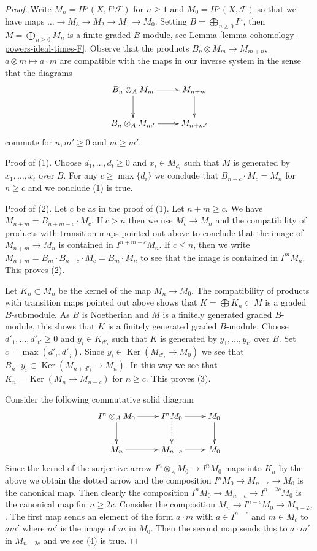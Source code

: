 \documentclass{stacks-project}
\theoremstyle{plain}
\theoremstyle{definition}
\theoremstyle{remark}
\numberwithin{equation}{subsection}
\def\Ker{\mathop{\mathrm{Ker}}}
\begin{document}
\begin{proof}
Write $M_n = H^p(X, I^n\mathcal{F})$ for $n \geq 1$ and
$M_0 = H^p(X, \mathcal{F})$ so that we have maps
$\ldots \to M_3 \to M_2 \to M_1 \to M_0$. Setting
$B = \bigoplus_{n \geq 0} I^n$, then $M = \bigoplus_{n \geq 0} M_n$
is a finite graded $B$-module, see
Lemma \ref{lemma-cohomology-powers-ideal-times-F}.
Observe that the products
$B_n \otimes M_m \to M_{m + n}$, $a \otimes m \mapsto a \cdot m$
are compatible with the maps in our inverse system in the sense
that the diagrams
$$
\xymatrix{
B_n \otimes_A M_m \ar[r] \ar[d] & M_{n + m} \ar[d] \\
B_n \otimes_A M_{m'} \ar[r] & M_{n + m'}
}
$$
commute for $n, m' \geq 0$ and $m \geq m'$.

\medskip\noindent
Proof of (1). Choose $d_1, \ldots, d_t \geq 0$ and $x_i \in M_{d_i}$
such that $M$ is generated by $x_1, \ldots, x_t$ over $B$.
For any $c \geq \max\{d_i\}$ we conclude that
$B_{n - c} \cdot M_c = M_n$ for $n \geq c$ and we conclude (1) is true.

\medskip\noindent
Proof of (2). Let $c$ be as in the proof of (1). Let $n + m \geq c$.
We have $M_{n + m} = B_{n + m - c} \cdot M_c$.
If $c > n$ then we use $M_c \to M_n$ and the compatibility of products
with transition maps pointed out above to conclude that
the image of $M_{n + m} \to M_n$ is contained in $I^{n + m - c}M_n$.
If $c \leq n$, then we write $M_{n + m} = B_m \cdot B_{n - c} \cdot M_c =
B_m \cdot M_n$ to see that the image is contained in $I^m M_n$.
This proves (2).

\medskip\noindent
Let $K_n \subset M_n$ be the kernel of the map $M_n \to M_0$. The
compatibility of products with transition maps pointed out above
shows that $K = \bigoplus K_n \subset M$ is a graded $B$-submodule.
As $B$ is Noetherian and $M$ is a finitely generated graded $B$-module,
this shows that $K$ is a finitely generated graded $B$-module.
Choose $d'_1, \ldots, d'_{t'} \geq 0$ and $y_i \in K_{d'_i}$
such that $K$ is generated by $y_1, \ldots, y_{t'}$ over $B$.
Set $c = \max(d'_i, d'_j)$. Since $y_i \in \Ker(M_{d'_i} \to M_0)$
we see that $B_n \cdot y_i \subset \Ker(M_{n + d'_i} \to M_n)$.
In this way we see that $K_n = \Ker(M_n \to M_{n - c})$ for $n \geq c$.
This proves (3).

\medskip\noindent
Consider the following commutative solid diagram
$$
\xymatrix{
I^n \otimes_A M_0 \ar[r] \ar[d] &
I^nM_0 \ar[r] \ar@{..>}[d] &
M_0 \ar[d] \\
M_n \ar[r] &
M_{n - c} \ar[r] &
M_0
}
$$
Since the kernel of the surjective arrow $I^n \otimes_A M_0 \to I^nM_0$
maps into $K_n$ by the above we obtain the dotted arrow and the
composition $I^nM_0 \to M_{n - c} \to M_0$ is the canonical map.
Then clearly the composition $I^nM_0 \to M_{n - c} \to I^{n - 2c}M_0$
is the canonical map for $n \geq 2c$. Consider the composition
$M_n \to I^{n - c}M_0 \to M_{n - 2c}$. The first map
sends an element of the form $a \cdot m$
with $a \in I^{n - c}$ and $m \in M_c$
to $a m'$ where $m'$ is the image of $m$ in $M_0$.
Then the second map sends this to $a \cdot m'$ in $M_{n - 2c}$ and
we see (4) is true.


\end{proof}
\end{document}
